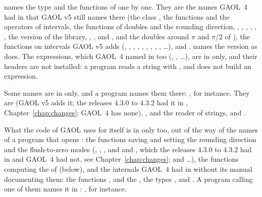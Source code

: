 \medskip
{} names the type and the functions of  one by
one.\newinvfive{} They are the names GAOL~4 had in  that GAOL v5
still names there (the class , the functions and the operators
of intervals, the functions of
doubles and the rounding direction, ,
, , ,
, , the version of the library,
, ,  and
, and the doubles around $\pi$ and $\pi/2$ of
), the functions on intervals GAOL v5 adds (,
, , , , ,
, , ,
\ldots),  and
.  names the version as 
does. The expressions, which GAOL~4 named in  too (,
, \ldots), are in
 only, and their headers are not installed: a program reads
a string with , and does not build an
expression.\newinvfive

\noindent
Some names are in  only, and a program names them there:
, for instance.\newinvfive{} They are
 (GAOL v5 adds it; the releases 4.3.0 to 4.3.2 had it in
, Chapter~\ref{chap:changes}; GAOL~4 has none), , and the
reader of strings,  and .

What the code of GAOL uses for itself is in  only too, out of
the way of the names of a program that opens : the functions saving
and setting the rounding direction and the flush-to-zero modes
(, , , and
 and ,
which the releases 4.3.0 to 4.3.2 had in  and GAOL~4 had not, see
Chapter~\ref{chap:changes}; and \ldots), the functions computing the  of
 (below), and the internals GAOL~4 had in  without its
manual documenting them: the functions ,
 and the , the types
,  and . A program calling one
of them names it in : ,
for instance.

